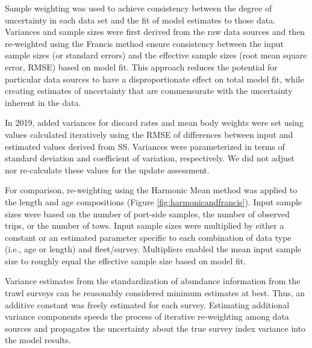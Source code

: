 \documentclass[11pt,
  english,
  a4paper,
]{article}
\begin{document}
\leavevmode\tagmcend\tagstructend


Sample weighting was used to achieve consistency between the degree of uncertainty in each data set and the fit of model estimates to those data. Variances and sample sizes were first derived from the raw data sources and then re-weighted using the Francis method ensure consistency between the input sample sizes (or standard errors) and the effective sample sizes (root mean square error, RMSE) based on model fit. This approach reduces the potential for particular data sources to have a disproportionate effect on total model fit, while creating estimates of uncertainty that are commensurate with the uncertainty inherent in the data.

\leavevmode\tagmcend\tagstructend\par


In 2019, added variances for discard rates and mean body weights were set using values calculated iteratively using the RMSE of differences between input and estimated values derived from SS. Variances were parameterized in terms of standard deviation and coefficient of variation, respectively. We did not adjust nor re-calculate these values for the update assessment.

\leavevmode\tagmcend\tagstructend\par


For comparison, re-weighting using the Harmonic Mean method was applied to the length and age compositions (Figure \ref{fig:harmonicandfrancis}). Input sample sizes were based on the number of port-side samples, the number of observed trips, or the number of tows. Input sample sizes were multiplied by either a constant or an estimated parameter specific to each combination of data type (i.e., age or length) and fleet/survey. Multipliers enabled the mean input sample size to roughly equal the effective sample size based on model fit.

\leavevmode\tagmcend\tagstructend\par


Variance estimates from the standardization of abundance information from the trawl surveys can be reasonably considered minimum estimates at best. Thus, an additive constant was freely estimated for each survey. Estimating additional variance components speeds the process of iterative re-weighting among data sources and propagates the uncertainty about the true survey index variance into the model results.
\end{document}
